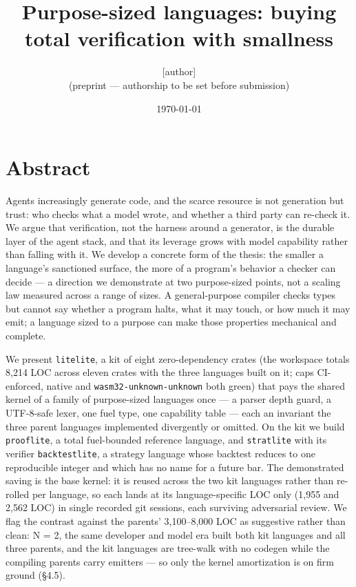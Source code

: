 \documentclass[11pt]{article}
\title{Purpose-sized languages: buying total verification with smallness}
\author{[author]\\\normalsize (preprint --- authorship to be set before submission)}
\date{\today}
\newcommand{\code}[1]{\texttt{#1}}
\begin{document}
\maketitle

\section*{Abstract}

Agents increasingly generate code, and the scarce resource is not generation
but trust: who checks what a model wrote, and whether a third party can
re-check it. We argue that verification, not the harness around a generator, is
the durable layer of the agent stack, and that its leverage grows with model
capability rather than falling with it. We develop a concrete form of the
thesis: the smaller a language's sanctioned surface, the more of a program's
behavior a checker can decide --- a direction we demonstrate at two purpose-sized
points, not a scaling law measured across a range of sizes. A
general-purpose compiler checks types but cannot say whether a program halts,
what it may touch, or how much it may emit; a language sized to a purpose can
make those properties mechanical and complete.

We present \code{litelite}, a kit of eight zero-dependency crates (the workspace
totals 8,214 LOC across eleven crates with the three languages built on it; caps
CI-enforced, native and \code{wasm32-unknown-unknown} both green) that pays the
shared kernel of a family of purpose-sized languages once --- a parser depth
guard, a UTF-8-safe lexer, one fuel type, one capability table --- each an
invariant the three parent languages implemented divergently or omitted. On the
kit we build \code{prooflite}, a total fuel-bounded reference language, and
\code{stratlite} with its verifier \code{backtestlite}, a strategy language whose backtest
reduces to one reproducible integer and which has no name for a future bar. The
demonstrated saving is the base kernel: it is reused across the two kit
languages rather than re-rolled per language, so each lands at its
language-specific LOC only (1,955 and 2,562 LOC) in single recorded git
sessions, each surviving adversarial review. We flag the contrast against the
parents' 3,100--8,000 LOC as suggestive rather than clean: N = 2, the same
developer and model era built both kit languages and all three parents, and the
kit languages are tree-walk with no codegen while the compiling parents carry
emitters --- so only the kernel amortization is on firm ground (\S{}4.5).
\end{document}

